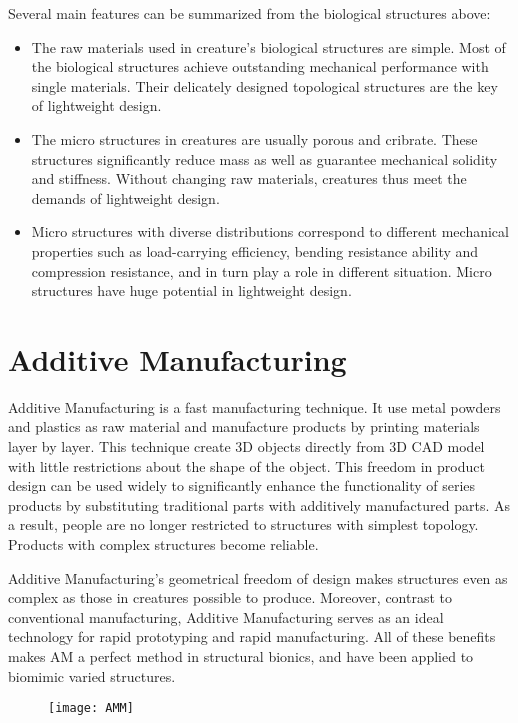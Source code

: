 Several main features can be summarized from the biological structures above:
\begin{itemize}
\item The raw materials used in creature's biological structures are simple. Most of the biological structures achieve outstanding mechanical performance with single materials. Their delicately designed topological structures are the key of lightweight design.

\item The micro structures in creatures are usually porous and cribrate. These structures significantly reduce mass as well as guarantee mechanical solidity and stiffness. Without changing raw materials, creatures thus meet the demands of lightweight design.

\item Micro structures with diverse distributions correspond to different mechanical properties such as load-carrying efficiency, bending resistance ability and compression resistance, and in turn play a role in different situation. Micro structures have huge potential in lightweight design.
\end{itemize}

\section{Additive Manufacturing}

Additive Manufacturing is a fast manufacturing technique. It use metal powders and plastics as raw material and manufacture products by printing materials layer by layer. This technique create 3D objects directly from 3D CAD model with little restrictions about the shape of the object. This freedom in product design can be used widely to significantly enhance the functionality of series products by substituting traditional parts with additively manufactured parts. As a result, people are no longer restricted to structures with simplest topology. Products with complex structures become reliable. 

Additive Manufacturing’s geometrical freedom of design makes structures even as complex as those in creatures possible to produce. Moreover, contrast to conventional manufacturing, Additive Manufacturing serves as an ideal technology for rapid prototyping and rapid manufacturing. All of these benefits makes AM a perfect method in structural bionics, and have been applied to biomimic varied structures.

\begin{figure}
	\centering
	\texttt{[image: AMM]}
	\label{fig:4}
\end{figure}

